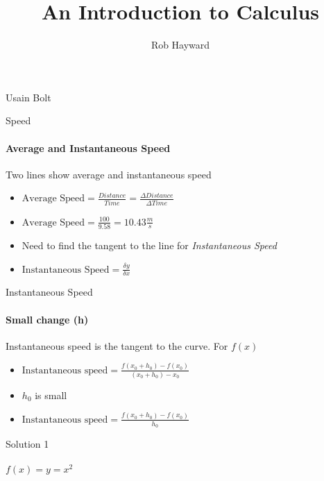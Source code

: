 \documentclass[14pt,xcolor=pdftex,dvipsnames,table, handout]{beamer}
\title{An Introduction to Calculus}
\author{Rob Hayward}
\date{}
\begin{document}
\begin{frame}
\titlepage
\end{frame}


\begin{frame}{Usain Bolt}
\end{frame}

\begin{frame}{Speed}
\framesubtitle{Average and Instantaneous Speed}
Two lines show average and instantaneous speed
\pause
\begin{itemize}[<+-| alert@+>]
\item $\text{Average Speed} = \frac{Distance}{Time} = \frac{\Delta Distance}{\Delta Time}$
\item $\text{Average Speed} = \frac{100}{9.58} = 10.43\frac{m}{s}$
\item Need to find the tangent to the line for \emph{Instantaneous Speed}
\item $\text{Instantaneous Speed} = \frac{\delta y}{\delta x}$
\end{itemize}
\end{frame}

\begin{frame}{Instantaneous Speed}
\framesubtitle{Small change (h)}
Instantaneous speed is the tangent to the curve.  For $f(x)$
\pause
\begin{itemize}[<+-| alert@+>]
\item $\text{Instantaneous speed} = \frac{f(x_0 + h_0) - f(x_0)}{(x_0 +h_0) - 
x_0}$ 
\item $h_0$ is small
\item $\text{Instantaneous speed} = \frac{f(x_0 + h_0) - f(x_0)}{h_0}$
\end{itemize}
\end{frame}

\begin{frame}{Solution 1}
\framesubtitle{$f(x) = y = x^2$}
\end{frame}
\end{document}
